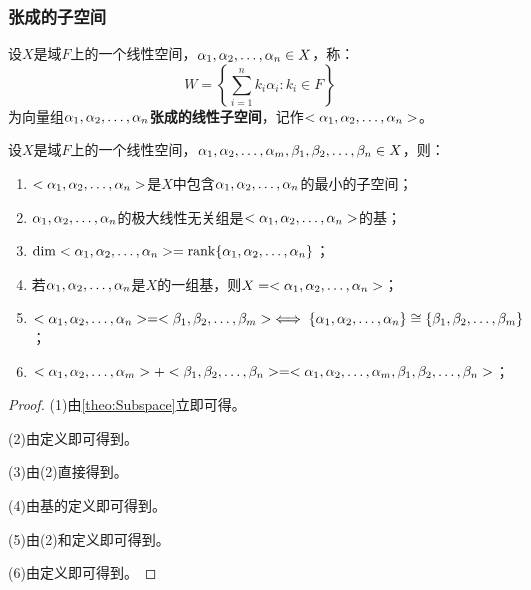 \subsubsection{张成的子空间}
\begin{definition}
	设$X$是域$F$上的一个线性空间，$\alpha_1, \alpha_2, \dots, \alpha_{n}\in X$，称：
	\begin{equation*}
		W=\left\{\sum_{i=1}^{n}k_i\alpha_i:k_i\in F\right\}
	\end{equation*}
	为向量组$\alpha_1, \alpha_2, \dots, \alpha_{n}$\textbf{张成的线性子空间}，记作$<\alpha_1, \alpha_2, \dots, \alpha_{n}>$。
\end{definition}
\begin{property}\label{prop:SpanSubspace}
	设$X$是域$F$上的一个线性空间，$\alpha_1, \alpha_2, \dots, \alpha_{m},\beta_1, \beta_2, \dots, \beta_{n}\in X$，则：
	\begin{enumerate}
		\item $<\alpha_1, \alpha_2, \dots, \alpha_{n}>$是$X$中包含$\alpha_1, \alpha_2, \dots, \alpha_{n}$的最小的子空间；
		\item $\alpha_1, \alpha_2, \dots, \alpha_{n}$的极大线性无关组是$<\alpha_1, \alpha_2, \dots, \alpha_{n}>$的基；
		\item $\operatorname{dim}<\alpha_1, \alpha_2, \dots, \alpha_{n}>=\operatorname{rank}\{\alpha_1, \alpha_2, \dots, \alpha_{n}\}$；
		\item 若$\alpha_1, \alpha_2, \dots, \alpha_{n}$是$X$的一组基，则$X=<\alpha_1, \alpha_2, \dots, \alpha_{n}>$；
		\item $<\alpha_1, \alpha_2, \dots, \alpha_{n}>=<\beta_1, \beta_2, \dots, \beta_{m}>\iff\{\alpha_1, \alpha_2, \dots, \alpha_{n}\}\cong\{\beta_1, \beta_2, \dots, \beta_{m}\}$；
		\item $<\alpha_1, \alpha_2, \dots, \alpha_{m}>+<\beta_1, \beta_2, \dots, \beta_{n}>=<\alpha_1, \alpha_2, \dots, \alpha_{m},\beta_1, \beta_2, \dots, \beta_{n}>$；
	\end{enumerate}
\end{property}
\begin{proof}
	(1)由\cref{theo:Subspace}立即可得。\par
	(2)由定义即可得到。\par
	(3)由(2)直接得到。\par
	(4)由基的定义即可得到。\par
	(5)由(2)和定义即可得到。\par
	(6)由定义即可得到。
\end{proof}

